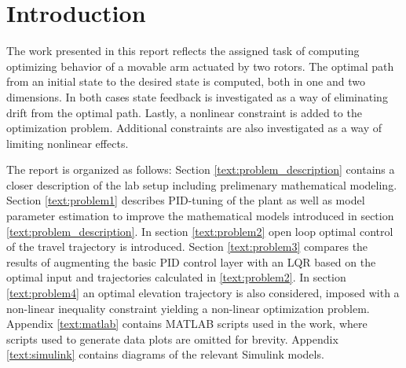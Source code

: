 \section{Introduction}
The work presented in this report reflects the assigned task of computing optimizing behavior of a movable arm actuated by two rotors. The optimal path from an initial state to the desired state is computed, both in one and two dimensions. In both cases state feedback is investigated as a way of eliminating drift from the optimal path. Lastly, a nonlinear constraint is added to the optimization problem. Additional constraints are also investigated as a way of limiting nonlinear effects.

The report is organized as follows: Section \ref{text:problem_description} contains a closer description of the lab setup including prelimenary mathematical modeling. Section \ref{text:problem1} describes PID-tuning of the plant as well as model parameter estimation to improve the mathematical models introduced in section \ref{text:problem_description}. In section \ref{text:problem2} open loop optimal control of the travel trajectory is introduced. Section \ref{text:problem3} compares the results of augmenting the basic PID control layer with an LQR based on the optimal input and trajectories calculated in \ref{text:problem2}. In section \ref{text:problem4} an optimal elevation trajectory is also considered, imposed with a non-linear inequality constraint yielding a non-linear optimization problem. Appendix \ref{text:matlab} contains MATLAB scripts used in the work, where scripts used to generate data plots are omitted for brevity. Appendix \ref{text:simulink} contains diagrams of the relevant Simulink models.
